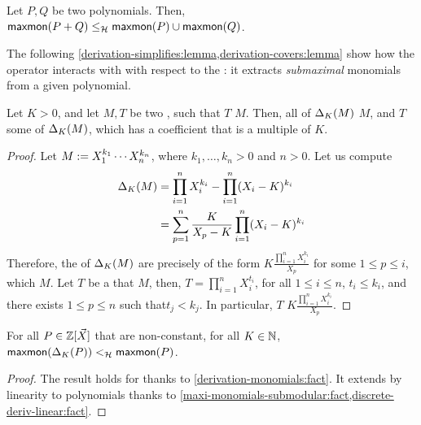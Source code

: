 \begin{fact}
    \label{maxi-monomials-submodular:fact}
    Let $P, Q$ be two polynomials.
    Then, $\mathop{\mathsf{maxmon}}(P+Q) \leq_{\mathcal{H}} \mathop{\mathsf{maxmon}}(P)
    \cup \mathop{\mathsf{maxmon}}(Q)$.
\end{fact}

The following \cref{derivation-simplifies:lemma,derivation-covers:lemma} 
show how the  operator
interacts with  with respect to the :
it extracts \emph{submaximal} monomials from a given polynomial.


\begin{fact}
    \label{derivation-monomials:fact}
    Let $K > 0$,
    and let $M,T$ be two , such that
    $T$  $M$.
    Then,
    all  of $\Delta_{K}(M)$  $M$,
    and 
    $T$  some 
    of $\Delta_{K}(M)$, which has a coefficient
    that is a multiple of $K$.
\end{fact}
\begin{proof}
    Let $M \mathrel{:=} X_1^{k_1} \cdots X_n^{k_n}$,
    where $k_1, \dots, k_n > 0$ and $n > 0$.
    Let us compute
    \begin{align*}
        \Delta_{K}(M) &= \prod_{i = 1}^n X_i^{k_i} - \prod_{i = 1}^n (X_i - K)^{k_i} \\
                    &= \sum_{p = 1}^n \frac{K}{X_p - K} \prod_{i = 1}^n (X_i - K)^{k_i} 
    \end{align*}
    Therefore, 
    the  of $\Delta_{K}(M)$
    are precisely
    of the form $K \frac{\prod_{i = 1}^n X_i^{k_i}}{X_p}$ for some $1 \leq p \leq i$,
    which  $M$.
    Let $T$ be a  that  $M$,
    then, $T = \prod_{i = 1}^n X_i^{t_i}$, 
    for all $1 \leq i \leq n$, $t_i \leq k_i$,
    and there exists $1 \leq p \leq n$ such that$ t_j < k_j$.
    In particular, $T$ 
    $K \frac{\prod_{i = 1}^n X_i^{k_i}}{X_p}$.
\end{proof}

\begin{lemma}
    \label{derivation-simplifies:lemma}
    For all $P \in \mathbb{Z}[\vec{X}]$ that are non-constant,
    for all $K \in \mathbb{N}$,
    $\mathop{\mathsf{maxmon}}(\Delta_{K}(P)) <_{\mathcal{H}}
    \mathop{\mathsf{maxmon}}(P)$.
\end{lemma}
\begin{proof}
    The result holds for 
    thanks to \cref{derivation-monomials:fact}.
    It extends by linearity to polynomials 
    thanks to \cref{maxi-monomials-submodular:fact,discrete-deriv-linear:fact}.
\end{proof}


